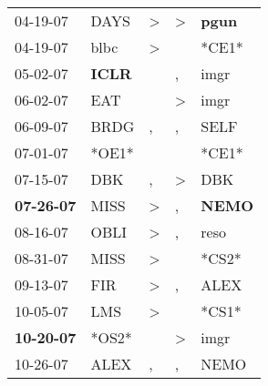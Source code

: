 \begin{supertabular}{p{0.07\textwidth}p{0.06\textwidth}p{0.02\textwidth}p{0.02\textwidth}p{0.06\textwidth}}
          04-19-07\textsuperscript{} &           DAYS\textsuperscript{} &     \textgreater &     \textgreater &  \textbf{pgun\textsuperscript{}} \\
          04-19-07\textsuperscript{} &           blbc\textsuperscript{} &     \textgreater &                  &                            *CE1* \\
          05-02-07\textsuperscript{} &  \textbf{ICLR\textsuperscript{}} &                  &                , &           imgr\textsuperscript{} \\
          06-02-07\textsuperscript{} &            EAT\textsuperscript{} &                  &     \textgreater &           imgr\textsuperscript{} \\
          06-09-07\textsuperscript{} &           BRDG\textsuperscript{} &                , &                , &           SELF\textsuperscript{} \\
          07-01-07\textsuperscript{} &                            *OE1* &                  &                  &                            *CE1* \\
          07-15-07\textsuperscript{} &            DBK\textsuperscript{} &                , &     \textgreater &            DBK\textsuperscript{} \\
 \textbf{07-26-07\textsuperscript{}} &           MISS\textsuperscript{} &     \textgreater &                , &  \textbf{NEMO\textsuperscript{}} \\
          08-16-07\textsuperscript{} &           OBLI\textsuperscript{} &     \textgreater &                , &           reso\textsuperscript{} \\
          08-31-07\textsuperscript{} &           MISS\textsuperscript{} &     \textgreater &                  &                            *CS2* \\
          09-13-07\textsuperscript{} &            FIR\textsuperscript{} &     \textgreater &                , &           ALEX\textsuperscript{} \\
          10-05-07\textsuperscript{} &            LMS\textsuperscript{} &     \textgreater &                  &                            *CS1* \\
 \textbf{10-20-07\textsuperscript{}} &                            *OS2* &                  &     \textgreater &           imgr\textsuperscript{} \\
          10-26-07\textsuperscript{} &           ALEX\textsuperscript{} &                , &                , &           NEMO\textsuperscript{} \\

\end{supertabular}
